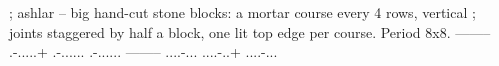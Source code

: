 ; ashlar -- big hand-cut stone blocks: a mortar course every 4 rows, vertical
; joints staggered by half a block, one lit top edge per course. Period 8x8.
--------
.-.....+
.-......
.-......
--------
....-...
....-..+
....-...
